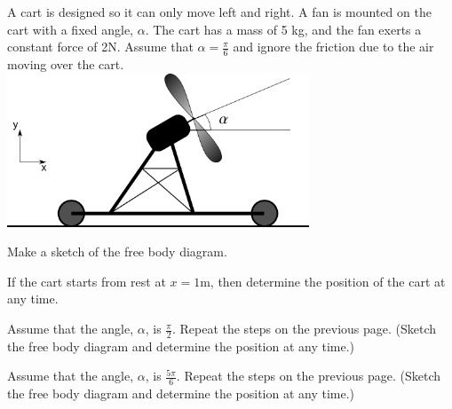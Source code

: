 \begin{problem}
\item A cart is designed so it can only move left and right. A fan is
  mounted on the cart with a fixed angle, $\alpha$. The cart has a
  mass of 5 kg, and the fan exerts a constant force of 2N. Assume that
  $\alpha=\frac{\pi}{6}$ and ignore the friction due to the air moving
  over the cart.  \\
  \includegraphics[width=9cm]{ink/week6/airCart}
  \begin{subproblem}
    \item Make a sketch of the free body diagram.
      \vspace{10em}
    \item If the cart starts from rest at $x=1$m, then determine the
      position of the cart at any time.
      \vfill
      \clearpage
    \item Assume that the angle, $\alpha$, is $\frac{\pi}{2}$. Repeat
      the steps on the previous page. (Sketch the free body diagram
      and determine the position at any time.)
      \vfill
      \clearpage
    \item Assume that the angle, $\alpha$, is $\frac{5\pi}{6}$. Repeat
      the steps on the previous page. (Sketch the free body diagram
      and determine the position at any time.)
      \vfill
  \end{subproblem}
\end{problem}


